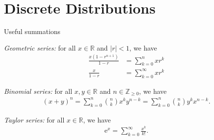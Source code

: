\documentclass[8pt, handout]{beamer}
\renewcommand{\emph}[1]{\textcolor{defcol}{\textsl{#1}}}
\begin{document}
\section{Discrete Distributions}

\begin{frame}{Useful summations}

    \emph{Geometric series:} for all \(x \in \mathbb{R}\) and \(|r| < 1\), we have
    \begin{align*}
        \frac{x(1 - r^{n+1})}{1 - r} &= \sum_{k=0}^{n} x r^k \\%
        \frac{x}{1 - r} &= \sum_{k=0}^{\infty} x r^k %
    \end{align*}

    \emph{Binomial series:} for all \(x,y\in\mathbb{R}\) and \(n \in \mathbb{Z}_{\ge0}\), we have 
    \begin{align*}
        (x + y)^n = \sum_{k=0}^n \binom{n}{k} x^k y^{n - k} = \sum_{k=0}^n \binom{n}{k} y^k x^{n - k}.
    \end{align*}

    \emph{Taylor series:} for all \(x \in \mathbb{R}\), we have
    \begin{align*}
        \mathrm{e}^x = \sum_{k=0}^{\infty} \frac{x^k}{k!}.
    \end{align*}

\end{frame}
\end{document}
